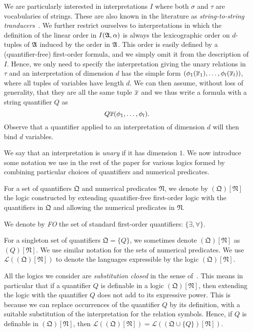 \documentclass[a4paper,UKenglish,cleveref, autoref, thm-restate, anonymous]{lipics-v2021}
\begin{document}
We are particularly interested in interpretations $I$ where both $\sigma$ and $\tau$ are vocabularies of strings.  These are also known in the literature as \emph{string-to-string tranducers}~\cite{CITE3}.    We further restrict ourselves to interpretations in which the definition of the linear order in $I(\mathfrak{A},\alpha)$ is always the lexicographic order on $d$-tuples of $\mathfrak{A}$ induced by the order in $\mathfrak{A}$.  This order is easily defined by a (quantifier-free) first-order formula, and we simply omit it from the description of $I$.  Hence, we only need to specify the interpretation giving the unary relations in $\tau$ and an interpretation of dimension $d$ has the simple form $(\phi_1(\overline{x}_1),\ldots, \phi_l(\overline{x}_l))$, where all tuples of variables have length $d$.  We can then assume, without loss of generality, that they are all the same tuple $\overline{x}$ and we thus write a formula with a string quantifier $Q$ as
$$Q \overline{x} (\phi_1,\ldots,\phi_l).$$
Observe that a quantifier applied to an interpretation of dimension $d$ will then bind $d$ variables.

We say that an interpretation is \emph{unary} if it has dimension $1$.  We now introduce some notation we use in the rest of the paper for various logics formed by combining particular choices of quantifiers and numerical predicates.
\begin{definition}
  For a set of quantifiers $\mathfrak{Q}$ and numerical predicates $\mathfrak{N}$, we denote by $(\mathfrak{Q})[\mathfrak{N}]$ the logic constructed by extending quantifier-free first-order logic with the quantifiers in $\mathfrak{Q}$ and allowing the numerical predicates in $\mathfrak{N}$.

   We denote by \emph{FO} the set of standard first-order quantifiers: $\{\exists, \forall\}$.
\end{definition}
    For a singleton set of quantifiers $\mathfrak{Q} = \{Q\}$, we sometimes denote $(\mathfrak{Q})[\mathfrak{N}]$ as $(Q)[\mathfrak{N}]$. We use similar notation for the sets of numerical predicates. We use $\mathcal{L}((\mathfrak{Q})[\mathfrak{N}])$ to denote the languages expressible by the logic $(\mathfrak{Q})[\mathfrak{N}]$.

All the logics we consider are \emph{substitution closed} in the sense of~\cite{Ebb85}.  This means in particular that if a quantifier $Q$ is definable in a logic $(\mathfrak{Q})[\mathfrak{N}]$, then extending the logic with the quantifier $Q$ does not add to its expressive power.  This is because we can replace occurrences of the quantifier $Q$ by its definition, with a suitable substitution of the interpretation for the relation symbols.  Hence, if $Q$ is definable in $(\mathfrak{Q})[\mathfrak{N}]$, then $\mathcal{L}((\mathfrak{Q})[\mathfrak{N}]) = \mathcal{L}((\mathfrak{Q} \cup \{Q\})[\mathfrak{N}])$.
    
\end{document}
